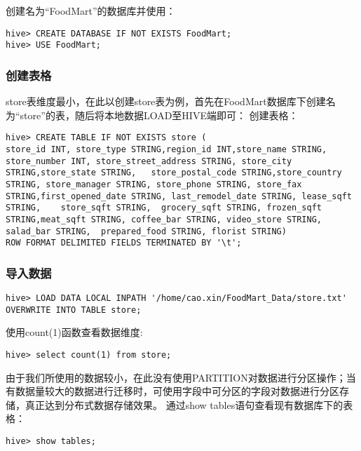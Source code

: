 创建名为``FoodMart''的数据库并使用：

\begin{lstlisting}
hive> CREATE DATABASE IF NOT EXISTS FoodMart;
hive> USE FoodMart;
\end{lstlisting}

\subsubsection{创建表格}\label{ux521bux5efaux8868ux683c}

store表维度最小，在此以创建store表为例，首先在FoodMart数据库下创建名为``store''的表，随后将本地数据LOAD至HIVE端即可：
创建表格：

\begin{lstlisting}
hive> CREATE TABLE IF NOT EXISTS store (
store_id INT, store_type STRING,region_id INT,store_name STRING, store_number INT, store_street_address STRING, store_city STRING,store_state STRING,   store_postal_code STRING,store_country STRING, store_manager STRING, store_phone STRING, store_fax STRING,first_opened_date STRING, last_remodel_date STRING, lease_sqft STRING,    store_sqft STRING,  grocery_sqft STRING, frozen_sqft STRING,meat_sqft STRING, coffee_bar STRING, video_store STRING, salad_bar STRING,  prepared_food STRING, florist STRING)
ROW FORMAT DELIMITED FIELDS TERMINATED BY '\t';
\end{lstlisting}

\subsubsection{导入数据}\label{ux5bfcux5165ux6570ux636e}

\begin{lstlisting}
hive> LOAD DATA LOCAL INPATH '/home/cao.xin/FoodMart_Data/store.txt' OVERWRITE INTO TABLE store;
\end{lstlisting}

使用count(1)函数查看数据维度:

\begin{lstlisting}
hive> select count(1) from store;
\end{lstlisting}

由于我们所使用的数据较小，在此没有使用PARTITION对数据进行分区操作；当有数据量较大的数据进行迁移时，可使用字段中可分区的字段对数据进行分区存储，真正达到分布式数据存储效果。
通过show tables语句查看现有数据库下的表格：

\begin{lstlisting}
hive> show tables;
\end{lstlisting}

